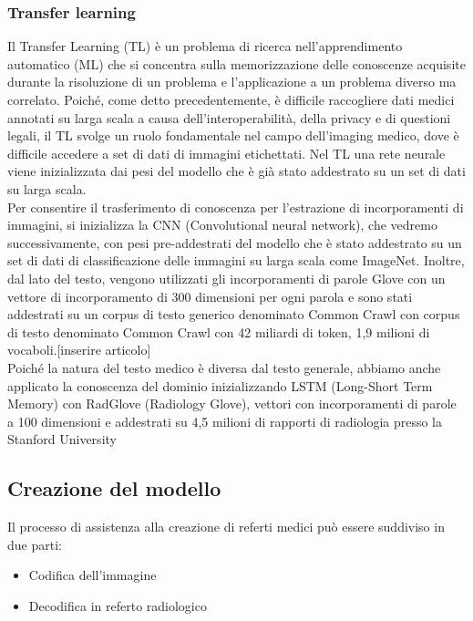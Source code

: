\documentclass[12pt,a4paper]{report}
\begin{document}
\subsubsection{Transfer learning}
Il Transfer Learning (TL) è un problema di ricerca nell'apprendimento automatico (ML) che si concentra sulla memorizzazione delle conoscenze acquisite durante la risoluzione di un problema e l'applicazione a un problema diverso ma correlato.
Poiché, come detto precedentemente, è difficile raccogliere dati medici annotati su larga scala a causa dell'interoperabilità, della privacy e di questioni legali, il TL svolge un ruolo fondamentale nel campo dell'imaging medico, dove è difficile accedere a set di dati di immagini etichettati. Nel TL una rete neurale viene inizializzata dai pesi del modello che è già stato addestrato su un set di dati su larga scala.\\
Per consentire il trasferimento di conoscenza per l'estrazione di incorporamenti di immagini, si inizializza la CNN (Convolutional neural network), che vedremo successivamente, con pesi pre-addestrati del modello che è stato addestrato su un set di dati di classificazione delle immagini su larga scala come ImageNet. Inoltre, dal lato del testo, vengono utilizzati gli incorporamenti di parole Glove con un vettore di incorporamento di 300 dimensioni per ogni parola e sono stati addestrati su un corpus di testo generico denominato Common Crawl con corpus di testo denominato Common Crawl con 42 miliardi di token, 1,9 milioni di vocaboli.[inserire articolo]\\
Poiché la natura del testo medico è diversa dal testo generale, abbiamo anche applicato la conoscenza del dominio inizializzando LSTM (Long-Short Term Memory) con RadGlove (Radiology Glove), vettori con incorporamenti di parole a 100 dimensioni e addestrati su 4,5 milioni di rapporti di radiologia presso la Stanford University


\subsection{Creazione del modello}
Il processo di assistenza alla creazione di referti medici può essere suddiviso in due parti:
\begin{itemize}
    \item Codifica dell’immagine
    \item Decodifica in referto radiologico
\end{itemize}
\end{document}
